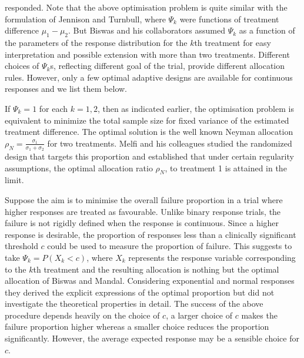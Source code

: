 responded. Note that the above optimisation problem is quite similar
with the formulation of Jennison and Turnbull\cite{41}, where
$\Psi_{k}$ were functions of treatment difference $\mu_1-\mu_2$. But
Biswas and his collaborators\cite{43} assumed $\Psi_{k}$ as a function of the
parameters of the response distribution for the $k$th treatment for
easy interpretation and possible extension with more than two
treatments. Different choices of $\Psi_{k}$s, reflecting different
goal of the trial, provide different allocation rules. However, only
a few optimal adaptive designs are available for continuous
responses and we list them below.

If $\Psi_{k}=1$ for each $k=1,2$, then  as indicated earlier, the optimisation problem is equivalent to minimize the total sample size for fixed variance
of the estimated treatment difference. The optimal solution is the
well known Neyman allocation $\rho_{N}=\frac{\sigma_{1}}{\sigma_{1}+\sigma_{2}}$ for two treatments. Melfi and his colleagues\cite{37} studied the randomized design that
targets this proportion and established that under certain regularity
assumptions, the optimal allocation ratio $\rho_{N}$, to treatment 1
is attained in the limit.

Suppose the aim is to minimise the overall failure proportion in a
trial where higher responses are treated as favourable. Unlike
binary response trials, the failure is not rigidly defined when the
response is continuous. Since a higher response is desirable, the
proportion of responses less than a clinically significant threshold
$c$ could be used to measure the proportion of failure. This suggests
to take $\Psi_{k}=P(X_{k}<c)$, where $X_{k}$ represents the response
variable corresponding to the $k$th treatment and the resulting
allocation is nothing but the optimal allocation of Biswas and
Mandal\cite{44}. Considering exponential and normal responses they derived the explicit expressions of the optimal proportion but did
not investigate the theoretical properties in detail. The success of
the above procedure depends heavily on the choice of $c$, a larger
choice of $c$ makes the failure proportion higher whereas a smaller
choice reduces the proportion significantly. However, the average
expected response may be a sensible
choice for $c$.

